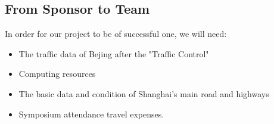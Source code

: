 \documentclass[12pt,letterpaper]{article}
\theoremstyle{definition}
\begin{document}
\subsection{From Sponsor to Team} %

In order for our project to be of successful one, we will need:
\begin{itemize}
    \item The traffic data of Bejing after the "Traffic Control"
    \item Computing resources
    \item The basic data and condition of Shanghai's main road and highways 
    \item Symposium attendance travel expenses.
\end{itemize}
\end{document}
